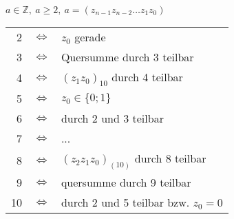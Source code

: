 $a \in \mathbb{Z},\ a \geq 2,\ a=(z_{n-1}z_{n-2} \dots z_1 z_0)$ \\
\begin{tabular}{rcl}
    2  & $\Leftrightarrow$ & $z_0$ gerade                           \\
    3  & $\Leftrightarrow$ & Quersumme durch 3 teilbar              \\
    4  & $\Leftrightarrow$ & $(z_1 z_0)_{10}$ durch 4 teilbar       \\
    5  & $\Leftrightarrow$ & $z_0 \in \lbrace 0; 1 \rbrace$         \\
    6  & $\Leftrightarrow$ & durch 2 und 3 teilbar                  \\
    7  & $\Leftrightarrow$ & ...                                    \\
    8  & $\Leftrightarrow$ & $(z_2 z_1 z_0)_{(10)}$ durch 8 teilbar \\
    9  & $\Leftrightarrow$ & quersumme durch 9 teilbar              \\
    10 & $\Leftrightarrow$ & durch 2 und 5 teilbar bzw. $z_0=0$
\end{tabular}
